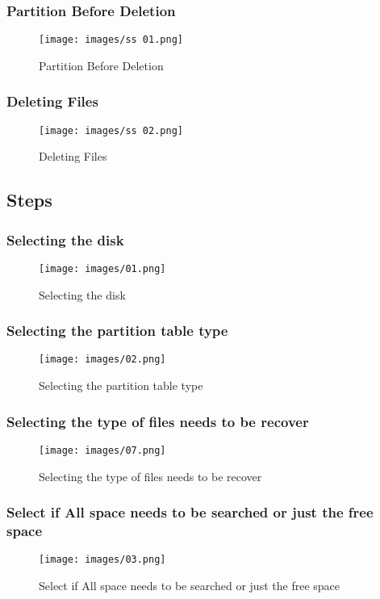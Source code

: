 \documentclass[11pt]{article}
\begin{document}
\subsubsection*{Partition Before Deletion}
\begin{figure}[H]
    \centering
    \texttt{[image: images/ss 01.png]}
    \caption{Partition Before Deletion}
\end{figure}

\subsubsection*{Deleting Files}
\begin{figure}[H]
    \centering
    \texttt{[image: images/ss 02.png]}
    \caption{Deleting Files}
\end{figure}

\subsection*{Steps}
\subsubsection*{Selecting the disk}
\begin{figure}[H]
    \centering
    \texttt{[image: images/01.png]}
    \caption{Selecting the disk}
\end{figure}

\subsubsection*{Selecting the partition table type}
\begin{figure}[H]
    \centering
    \texttt{[image: images/02.png]}
    \caption{Selecting the partition table type}
\end{figure}

\subsubsection*{Selecting the type of files needs to be recover}
\begin{figure}[H]
    \centering
    \texttt{[image: images/07.png]}
    \caption{Selecting the type of files needs to be recover}
\end{figure}

\subsubsection*{Select if All space needs to be searched or just the free space}
\begin{figure}[H]
    \centering
    \texttt{[image: images/03.png]}
    \caption{Select if All space needs to be searched or just the free space}
\end{figure}
\end{document}
